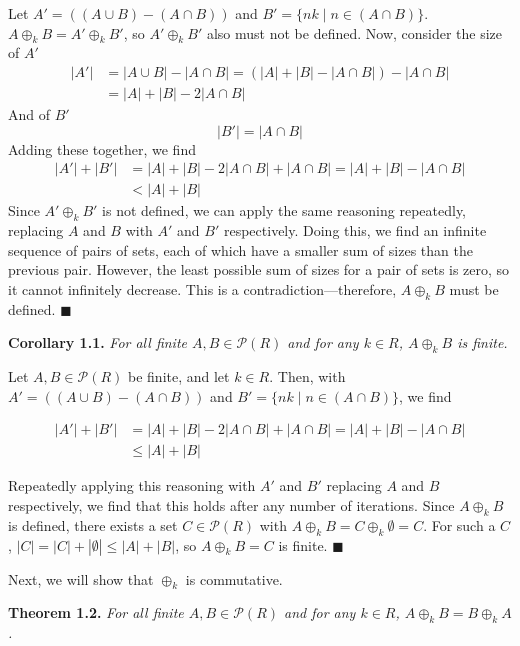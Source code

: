 \documentclass{article}
\newcommand{\abs}[1]{\left|#1\right|}
\begin{document}
Let $A' = ((A \cup B) - (A \cap B))$ and
$B' = \{nk \mid n \in (A \cap B)\}$. $A \oplus_k B = A' \oplus_k B'$,
so $A' \oplus_k B'$ also must not be defined. Now, consider the size
of $A'$
\[\begin{split}
\abs{A'} &= \abs{A \cup B} - \abs{A \cap B}
= (\abs{A} + \abs{B} - \abs{A \cap B}) - \abs{A \cap B} \\
&= \abs{A} + \abs{B} - 2\abs{A \cap B}
\end{split}\]
And of $B'$
\[\abs{B'} = \abs{A \cap B}\]
Adding these together, we find
\[\begin{split}
\abs{A'} + \abs{B'}
&= \abs{A} + \abs{B} - 2\abs{A \cap B} + \abs{A \cap B}
= \abs{A} + \abs{B} - \abs{A \cap B} \\
&< \abs{A} + \abs{B}
\end{split}\]
Since $A' \oplus_k B'$ is not defined, we can apply the same reasoning
repeatedly, replacing $A$ and $B$ with $A'$ and $B'$ respectively.
Doing this, we find an infinite sequence of pairs of sets, each of
which have a smaller sum of sizes than the previous pair.
However, the least possible sum of sizes for a pair of sets is zero,
so it cannot infinitely decrease. This is a contradiction---therefore,
$A \oplus_k B$ must be defined. $\blacksquare$

\textbf{Corollary 1.1.} \textit{
    For all finite $A, B \in \mathcal{P}(R)$
    and for any $k \in R$,
    $A \oplus_k B$ is finite.
}

Let $A, B \in \mathcal{P}(R)$ be finite, and let $k \in R$.
Then, with $A' = ((A \cup B) - (A \cap B))$ and
$B' = \{nk \mid n \in (A \cap B)\}$, we find

\[\begin{split}
    \abs{A'} + \abs{B'}
    &= \abs{A} + \abs{B} - 2\abs{A \cap B} + \abs{A \cap B}
    = \abs{A} + \abs{B} - \abs{A \cap B} \\
    &\leq \abs{A} + \abs{B}
\end{split}\]

Repeatedly applying this
reasoning with $A'$ and $B'$ replacing $A$ and $B$ respectively,
we find that this holds after any number of iterations. Since
$A \oplus_k B$ is defined, there exists a set
$C \in \mathcal{P}(R)$ with
$A \oplus_k B = C \oplus_k \emptyset = C$. For such a $C$,
$\abs{C} = \abs{C} + \abs{\emptyset} \leq \abs{A} + \abs{B}$,
so $A \oplus_k B = C$ is finite. $\blacksquare$

Next, we will show that $\oplus_k$ is commutative.

\textbf{Theorem 1.2.} \textit{
    For all finite $A, B \in \mathcal{P}(R)$
    and for any $k \in R$,
    $A \oplus_k B = B \oplus_k A$.
}
\end{document}
